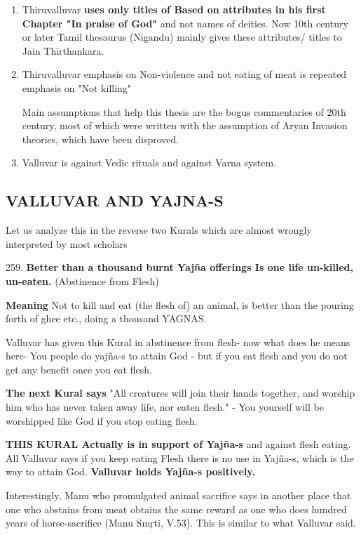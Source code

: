 \begin{enumerate}[{\rm 1)}]
\itemsep=0pt
\item Thiruvalluvar \textbf{uses only titles of Based on attributes in his first Chapter "In praise of God"} and not names of deities. Now 10th century or later Tamil thesaurus (Nigandu) mainly gives these attributes/ titles to Jain Thīrthankara.

 \item 
 Thiruvalluvar emphasis on Non-violence and not eating of meat is repeated emphasis on "Not killing"

 Main assumptions that help this thesis are the bogus commentaries of 20th century, most of which were written with the assumption of Aryan Invasion theories, which have been disproved.

 \item Valluvar is against Vedic rituals and against Varna system.

\end{enumerate}


\subsection*{VALLUVAR AND YAJNA-S}

Let us analyze this in the reverse two Kurals which are almost wrongly interpreted by most scholars

259. \textbf{Better than a thousand burnt Yajña offerings\supskpt{\endnote{}} Is one life un-killed, un-eaten.} (Abstinence from Flesh)

\textbf{Meaning} Not to kill and eat (the flesh of) an animal, is better than the pouring forth of ghee etc., doing a thousand YAGNAS.

Valluvar has given this Kural in abstinence from flesh- now what does he means here- You people do yajña-s to attain God - but if you eat flesh and you do not get any benefit once you eat flesh.

\textbf{The next Kural says} "All creatures will join their hands together, and worship him who has never taken away life, nor eaten flesh." - You yourself will be worshipped like God if you stop eating flesh.

\textbf{THIS KURAL Actually is in support of Yajña-s} and against flesh eating. All Valluvar says if you keep eating Flesh there is no use in Yajña-s, which is the way to attain God. \textbf{Valluvar holds Yajña-s positively.}

Interestingly, Manu who promulgated animal sacrifice says in another place that one who abstains from meat obtains the same reward as one who does hundred years of horse-sacrifice (Manu Smŗti, V.53). This is similar to what Valluvar said.

